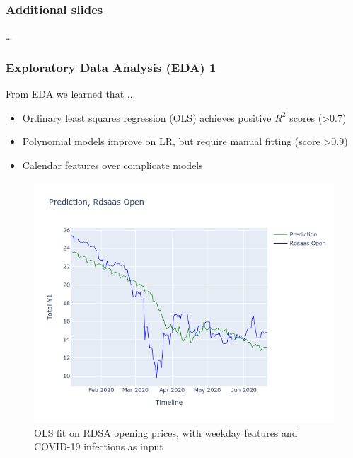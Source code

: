\documentclass[aspectratio=169,classic]{uva-inf-presentation}
\begin{document}
\begin{frame}
\frametitle{Additional slides}
\ldots
\end{frame}

\twocolumn

\begin{frame}
\frametitle{Exploratory Data Analysis (EDA) 1}
From EDA we learned that ...
\begin{itemize}
    \item Ordinary least squares regression (OLS) achieves positive $R^2$ scores (>0.7)
    \item Polynomial models improve on LR, but require manual fitting (score >0.9)
    \item Calendar features over complicate models
\end{itemize}
\begin{figure}\centering
    \includegraphics[trim=0cm 0cm 0 -6cm, scale=0.28]{images/EDA.png}
    \caption{OLS fit on RDSA opening prices, with weekday features and COVID-19 infections as input}
\end{figure}
\end{frame}
\end{document}
